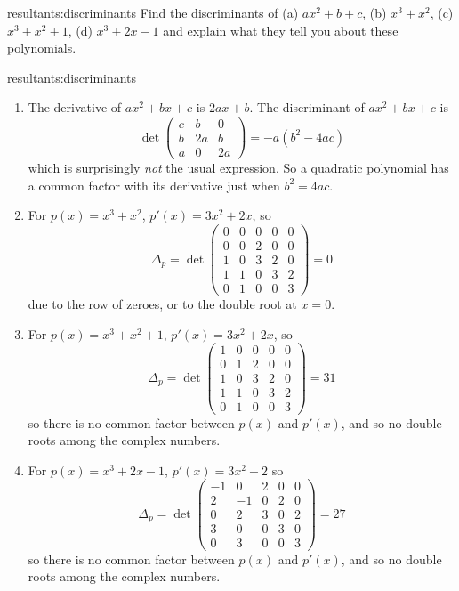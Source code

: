 \begin{problem}{resultants:discriminants}
Find the discriminants of (a) \(ax^2+b+c\), (b) \(x^3+x^2\), (c) \(x^3+x^2+1\), (d) \(x^3+2x-1\) and explain what they tell you about these polynomials.
\end{problem}
\begin{answer}{resultants:discriminants}
\begin{enumerate}
\item
The derivative of \(ax^2+bx+c\) is \(2ax+b\).
The discriminant of \(ax^2+bx+c\) is
\[
\det
\begin{pmatrix}
c & b & 0 \\
b & 2a & b \\
a & 0 & 2a
\end{pmatrix}
=
-a(b^2-4ac)
\]
which is surprisingly \emph{not} the usual expression.
So a quadratic polynomial has a common factor with its derivative just when \(b^2=4ac\).
\item
For \(p(x)=x^3+x^2\), \(p'(x)=3x^2+2x\), so
\[
\Delta_p
=
\det
\begin{pmatrix}
0 & 0 & 0 & 0 & 0 \\
0 & 0 & 2 & 0 & 0 \\
1 & 0 & 3 & 2 & 0 \\
1 & 1 & 0 & 3 & 2 \\
0 & 1 & 0 & 0 & 3
\end{pmatrix}
=0
\]
due to the row of zeroes, or to the double root at \(x=0\).
\item
For \(p(x)=x^3+x^2+1\), \(p'(x)=3x^2+2x\), so
\[
\Delta_p
=
\det
\begin{pmatrix}
1 & 0 & 0 & 0 & 0 \\
0 & 1 & 2 & 0 & 0 \\
1 & 0 & 3 & 2 & 0 \\
1 & 1 & 0 & 3 & 2 \\
0 & 1 & 0 & 0 & 3
\end{pmatrix}
=31
\]
so there is no common factor between \(p(x)\) and \(p'(x)\), and so no double roots among the complex numbers.
\item
For \(p(x)=x^3+2x-1\), \(p'(x)=3x^2+2\) so 
\[
\Delta_p
=
\det
\begin{pmatrix}
-1 &  0 & 2 & 0 & 0 \\
 2 & -1 & 0 & 2 & 0 \\
 0 &  2 & 3 & 0 & 2 \\
 3 &  0 & 0 & 3 & 0 \\
 0 &  3 & 0 & 0 & 3
\end{pmatrix}=27
\]
so there is no common factor between \(p(x)\) and \(p'(x)\), and so no double roots among the complex numbers.
\end{enumerate}
\end{answer}

